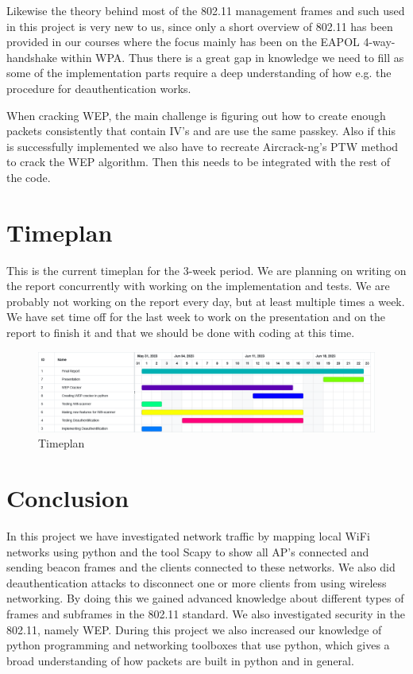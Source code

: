 Likewise the theory behind most of the 802.11 management frames and such used in this project is very new to us, since only a short overview of 802.11 has been provided in our courses where the focus mainly has been on the EAPOL 4-way-handshake within WPA. Thus there is a great gap in knowledge we need to fill as some of the implementation parts require a deep understanding of how e.g. the procedure for deauthentication works.

When cracking WEP, the main challenge is figuring out how to create enough packets consistently that contain IV's and are use the same passkey. Also if this is successfully implemented we also have to recreate Aircrack-ng's PTW method to crack the WEP algorithm. Then this needs to be integrated with the rest of the code. 

\section{Timeplan}
This is the current timeplan for the 3-week period. We are planning on writing on the report concurrently with working on the implementation and tests. We are probably not working on the report every day, but at least multiple times a week. We have set time off for the last week to work on the presentation and on the report to finish it and that we should be done with coding at this time. 
\begin{figure}[!htbp]
    \centering
    \includegraphics[width=1\textwidth]{Latex-Files/Billeder/Online Gantt 20230530.png}
    \caption{Timeplan}
    \label{timeplan}
\end{figure}

\section{Conclusion}
In this project we have investigated network traffic by mapping local WiFi networks using python and the tool Scapy to show all AP's connected and sending beacon frames and the clients connected to these networks. We also did deauthentication attacks to disconnect one or more clients from using wireless networking. By doing this we gained advanced knowledge about different types of frames and subframes in the 802.11 standard. We also investigated security in the 802.11, namely WEP. During this project we also increased our knowledge of python programming and networking toolboxes that use python, which gives a broad understanding of how packets are built in python and in general. 



